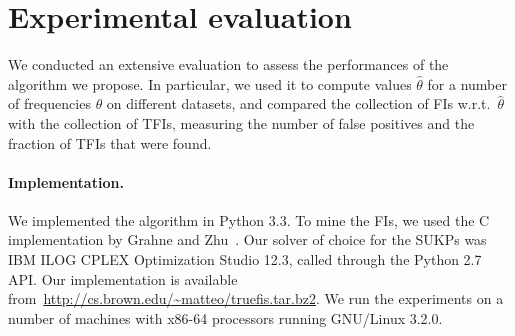 \section{Experimental evaluation}\label{sec:experiments}
We conducted an extensive evaluation to assess the performances of the algorithm
we propose. In particular, we used it %
to compute values $\hat\theta$
for a number of frequencies $\theta$ on different datasets, and compared the
collection of FIs w.r.t.~$\hat\theta$ with the collection of TFIs, measuring
the number of false positives %
and the fraction of TFIs that were found.



\paragraph*{Implementation.}
We implemented the algorithm in Python 3.3. %
To mine the FIs, we used the C implementation by Grahne
and Zhu~\citep{GrahneZ03}. %
Our solver of choice for the SUKPs was IBM\textsuperscript{\textregistered}
ILOG\textsuperscript{\textregistered} CPLEX\textsuperscript{\textregistered}
Optimization Studio 12.3, called through the Python 2.7 API.
Our implementation is available
from~\url{http://cs.brown.edu/~matteo/truefis.tar.bz2}. We run the experiments
on a number of machines with x86-64 processors running GNU/Linux 3.2.0.

